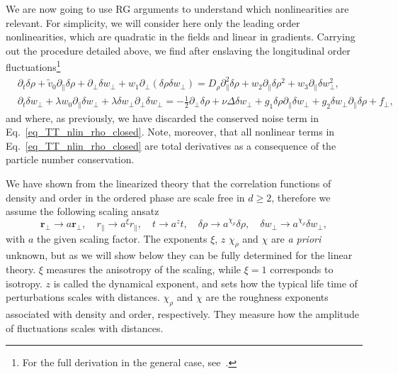 We are now going to use RG arguments to understand which nonlinearities are relevant. For simplicity, we will consider here only the leading order nonlinearities, which are quadratic in the fields and linear in gradients. 
Carrying out the procedure detailed above, we find after enslaving the longitudinal order fluctuations\footnote{For the full derivation in the general case, see~\cite{toner2012reanalysis}.}
\begin{subequations}
\label{eq_TT_nlin_closed}
\begin{align}
\label{eq_TT_nlin_rho_closed}
&\partial_t \delta \rho + \tilde{v}_0\partial_\| \delta \rho + \partial_\perp \delta w_\perp + w_1 \partial_\perp( \delta \rho \delta w_\perp ) = 
D_\rho \partial_\|^2 \delta\rho + w_2\partial_\|  \delta \rho^2 + w_3 \partial_\|  \delta w_\perp^2 , \\
\label{eq_TT_nlin_perp_closed}
&\partial_t \delta w_\perp + \lambda w_0  \partial_\| \delta w_\perp + \lambda\delta w_\perp  \partial_\perp \delta w_\perp =  
- \frac{1}{2}\partial_\perp \delta \rho + \nu \Delta \delta w_\perp + g_1 \delta \rho \partial_\|  \delta w_\perp + g_2\delta w_\perp\partial_\|\delta \rho  + f_\perp,
\end{align}
\end{subequations}
and where, as previously, we have discarded the conserved noise term in Eq.~\eqref{eq_TT_nlin_rho_closed}.
Note, moreover, that all nonlinear terms in Eq.~\eqref{eq_TT_nlin_rho_closed} are total derivatives as a consequence of the particle number conservation.

We have shown from the linearized theory that the correlation functions of density and order in the ordered phase are scale free in $d\ge 2$,
therefore 
we assume the following scaling ansatz
\begin{equation} \label{eq_rescaling}
\bm r_\perp \to a \bm r_\perp , \quad r_\| \to a^\xi r_\| , \quad t \to a^z t , \quad \delta\rho \to a^{\chi_\rho}\delta\rho , \quad \delta w_\perp \to a^{\chi_\rho}\delta w_\perp ,
\end{equation}
with $a$ the given scaling factor.
The exponents $\xi$, $z$ $\chi_\rho$ and $\chi$ are {\it a priori} unknown, but as we will show below they can be fully determined for the linear theory.
$\xi$ measures the anisotropy of the scaling, while $\xi = 1$ corresponds to isotropy.
$z$ is called the dynamical exponent, and sets how the typical life time of perturbations scales with distances. 
$\chi_\rho$ and $\chi$ are the roughness exponents associated with density and order, respectively. 
They measure how the amplitude of fluctuations scales with distances. 

